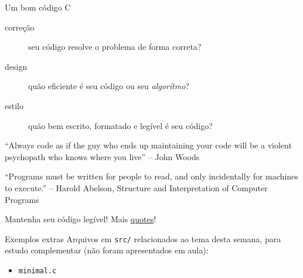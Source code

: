 \documentclass{beamer}
\begin{document}
\begin{frame}[allowframebreaks]{Um bom código C}

  \begin{description}
  \item[correção] seu código resolve o problema de forma correta?

  \item[design] quão eficiente é seu código ou seu \emph{algorítmo}?

  \item[estilo] quão bem escrito, formatado e legível é seu código?
  \end{description}

  \framebreak
  
  \begin{block}{}
    ``Always code as if the guy who ends up maintaining your code will
    be a violent psychopath who knows where you live'' -- John Woods
  \end{block}
  
  \begin{block}{}
    ``Programs must be written for people to read, and only
    incidentally for machines to execute.''  -- Harold Abelson,
    Structure and Interpretation of Computer Programs
  \end{block}

  Mantenha seu código legível! Mais
  \href{https://www.goodreads.com/quotes/tag/programming}{quotes}!

\end{frame}  



\begin{frame}{Exemplos extras}
  Arquivos em \texttt{src/} relacionados ao tema desta semana, para
  estudo complementar (não foram apresentados em aula):
  \begin{itemize}
    \item \texttt{minimal.c}
  \end{itemize}
\end{frame}
\end{document}
